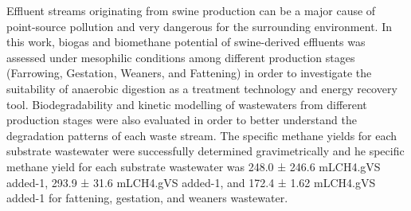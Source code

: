 Effluent streams originating from swine production can be a major cause of point-source pollution and very dangerous for the surrounding environment. In this work, biogas and biomethane potential of swine-derived effluents was assessed under mesophilic conditions among different production stages (Farrowing, Gestation, Weaners, and Fattening) in order to investigate the suitability of anaerobic digestion as a treatment technology and energy recovery tool. Biodegradability and kinetic modelling of wastewaters from different production stages were also evaluated in order to better understand the degradation patterns of each waste stream. The specific methane yields for each substrate wastewater were successfully determined gravimetrically and he specific methane yield for each substrate wastewater was 248.0 ± 246.6 mLCH4.gVS added-1, 293.9 ± 31.6 mLCH4.gVS added-1, and 172.4 ± 1.62 mLCH4.gVS added-1 for fattening, gestation, and weaners wastewater.